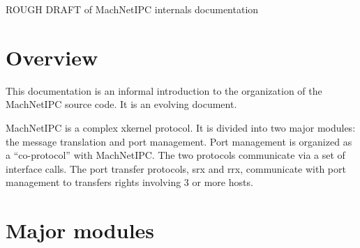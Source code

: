 

\large{ROUGH DRAFT of MachNetIPC internals documentation}

\section{Overview}
This documentation is an informal introduction to the organization
of the MachNetIPC source code.  It is an evolving document.

MachNetIPC is a complex xkernel protocol.  It is divided into two
major modules: the message translation and port management.  Port
management is organized as a ``co-protocol'' with MachNetIPC.  The
two protocols communicate via a set of interface calls.  The port
transfer protocols, srx and rrx, communicate with port management
to transfers rights involving 3 or more hosts.

\section{Major modules}

